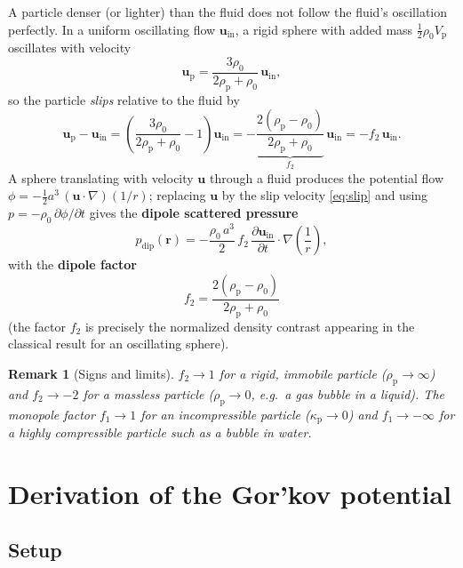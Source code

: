 \documentclass[11pt]{article}
\newtheorem{remark}{Remark}[section]
\newcommand{\pp}{\rho_{\mathrm{p}}}
\newcommand{\rrho}{\rho_{0}}
\newcommand{\kkp}{\kappa_{\mathrm{p}}}
\newcommand{\vp}{V_{\mathrm{p}}}
\newcommand{\uu}{\mathbf{u}}
\newcommand{\rr}{\mathbf{r}}
\begin{document}
A particle denser (or lighter) than the fluid does not follow the fluid's
oscillation perfectly. In a uniform oscillating flow $\uu_{\mathrm{in}}$, a rigid
sphere with added mass $\tfrac12\rrho\vp$ oscillates with velocity
\begin{equation}
  \uu_{\mathrm{p}}=\frac{3\rrho}{2\pp+\rrho}\,\uu_{\mathrm{in}},
  \label{eq:spherevel}
\end{equation}
so the particle \emph{slips} relative to the fluid by
\begin{equation}
  \uu_{\mathrm{p}}-\uu_{\mathrm{in}}
  =\left(\frac{3\rrho}{2\pp+\rrho}-1\right)\uu_{\mathrm{in}}
  =-\underbrace{\frac{2(\pp-\rrho)}{2\pp+\rrho}}_{f_{2}}\,\uu_{\mathrm{in}}
  =-f_{2}\,\uu_{\mathrm{in}}.
  \label{eq:slip}
\end{equation}
A sphere translating with velocity $\uu$ through a fluid produces the potential
flow $\phi=-\tfrac12 a^{3}\,(\uu\cdot\nabla)(1/r)$; replacing $\uu$ by the slip
velocity \eqref{eq:slip} and using $p=-\rrho\,\partial\phi/\partial t$ gives the
\textbf{dipole scattered pressure}
\begin{equation}
  p_{\mathrm{dip}}(\rr)=-\frac{\rrho\,a^{3}}{2}\,f_{2}\,
      \frac{\partial\uu_{\mathrm{in}}}{\partial t}\cdot\nabla\!\left(\frac{1}{r}\right),
  \label{eq:dipole}
\end{equation}
with the \textbf{dipole factor}
\begin{equation}
  \boxed{\;f_{2}=\frac{2(\pp-\rrho)}{2\pp+\rrho}\;}
  \label{eq:f2}
\end{equation}
(the factor $f_{2}$ is precisely the normalized density contrast appearing in
the classical result for an oscillating sphere).

\begin{remark}[Signs and limits]
$f_{2}\to1$ for a rigid, immobile particle ($\pp\to\infty$) and $f_{2}\to-2$
for a massless particle ($\pp\to0$, e.g.\ a gas bubble in a liquid). The
monopole factor $f_{1}\to1$ for an incompressible particle ($\kkp\to0$) and
$f_{1}\to-\infty$ for a highly compressible particle such as a bubble in water.
\end{remark}

\section{Derivation of the Gor'kov potential}
\label{sec:gor'kov}

\subsection{Setup}
\end{document}
